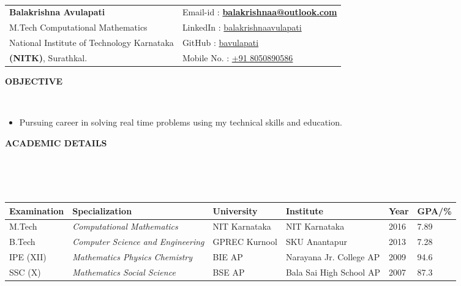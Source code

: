 \documentclass[a4paper,10pt]{article}
\newcommand{\lsep}{-0.5cm}
\newcommand{\resheading}[1]{{\small \colorbox{mygrey}{\begin{minipage}{0.975\textwidth}{\textbf{#1 \vphantom{p\^{E}}}}\end{minipage}}}}
\begin{document}
\hspace{0.5cm}\\[-0.2cm]

\begin{tabu}  { X[l] X[l] }

    \textbf{Balakrishna Avulapati} & \hspace{5em} Email-id \hspace{1em} : \textbf{\href{mailto:balakrishnaa@outlook.com}{balakrishnaa@outlook.com}} \\
    M.Tech Computational Mathematics & \hspace{5em} LinkedIn\hspace{1em} : \href{https://in.linkedin.com/in/balakrishnaavulapati}{balakrishnaavulapati} \\
    National Institute of Technology Karnataka & \hspace{5em} GitHub \hspace{1.4em} : \href{https://github.com/bavulapati}{bavulapati}  \\
    \textbf{(NITK)}, Surathkal. & \hspace{5em} Mobile No. : \href{tel:+918050890586}{+91 8050890586}\\
\end{tabu}

\medskip

\resheading{\textbf{OBJECTIVE} }\\[\lsep]
\begin{itemize}
    \item \noindent Pursuing career in solving real time problems using my technical skills and education.
\end{itemize}

\resheading{\textbf{ACADEMIC DETAILS} }\\[\lsep]
\\ \\
\indent \begin{tabular}{ l @{\hskip 0.15in} l @{\hskip 0.15in} l @{\hskip 0.15in} l @{\hskip 0.15in} l @{\hskip 0.15in} l }
    \hline
    \textbf{Examination} & \textbf{Specialization} & \textbf{University} & \textbf{Institute} & \textbf{Year} & \textbf{GPA/\%} \\
    \hline
    M.Tech & \textit{Computational Mathematics} & NIT Karnataka & NIT Karnataka & 2016 & 7.89 \\
    B.Tech & \textit{Computer Science and Engineering} & GPREC Kurnool & SKU Anantapur & 2013 & 7.28\\
    IPE (XII) & \textit{Mathematics Physics Chemistry} & BIE AP & Narayana Jr. College AP & 2009 & 94.6\\
    SSC (X) & \textit{Mathematics Social Science} & BSE AP & Bala Sai High School AP & 2007 & 87.3\\
    \hline
\end{tabular}
\end{document}
